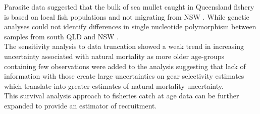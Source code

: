Parasite data suggested that the bulk of sea mullet caught in Queensland fishery is based on local fish populations and not migrating from NSW \citep{Lester2009129}. While genetic analyses could not identify differences in single nucleotide polymorphism between samples from south QLD and NSW \citep{kruck2013a}.\\

The sensitivity analysis to data truncation showed a weak trend in increasing uncertainty associated with natural mortality as more older age-groups containing few observations were added to the analysis suggesting that lack of information with those create large uncertainties on gear selectivity estimates which translate into greater estimates of natural mortality uncertainty.\\

This survival analysis approach to fisheries catch at age data can be further expanded to provide an estimator of recruitment.
